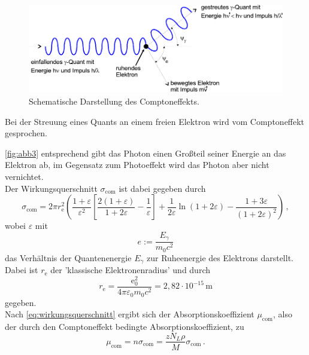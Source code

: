 \begin{figure}[H]
    \centering
    \includegraphics{figures/abb3.pdf}
    \caption{Schematische Darstellung des Comptoneffekts\cite{ap04}.}
    \label{fig:abb3}
\end{figure}

Bei der Streuung eines Quants an einem freien Elektron wird vom
Comptoneffekt gesprochen.


\autoref{fig:abb3} entsprechend gibt das Photon einen Großteil
seiner Energie an das Elektron ab, im Gegensatz zum Photoeffekt
wird das Photon aber nicht vernichtet. \\

Der Wirkungsquerschnitt $\sigma_{\mathrm{com}}$ ist dabei gegeben durch
\begin{equation}
    \sigma_{\mathrm{com}} = 2 \pi r^2_\mathrm{e} 
    \left(\frac{1 + \varepsilon}{\varepsilon^2} 
    \left[\frac{2(1 + \varepsilon)}{1 + 2 \varepsilon} -\frac{1}{\varepsilon}\right]
    + \frac{1}{2 \varepsilon} \ln(1 + 2 \varepsilon) 
    - \frac{1 + 3 \varepsilon}{(1 + 2 \varepsilon)^2}\right) \,,
    \label{eq:wirkungsquercompton}
\end{equation}
wobei $\varepsilon$ mit
\begin{equation*}
    e := \frac{E_\gamma}{m_0 c^2}
\end{equation*}
das Verhältnis der Quantenenergie $E_\gamma$ zur Ruheenergie 
des Elektrons darstellt.
Dabei ist $r_\text{e}$ der 'klassische Elektronenradius' und durch
\begin{equation*}
    r_\text{e} = \frac{\text{e}_0^2}
    {4 \pi \varepsilon_0 m_0 c^2} = 2,82 \cdot 10^{-15} \,\unit{\meter}
\end{equation*}
gegeben. \\

Nach \eqref{eq:wirkungsquerschnitt} ergibt sich der Absorptionskoeffizient
$\mu_{\text{com}}$, also der durch den Comptoneffekt bedingte
Absorptionskoeffizient, zu
\begin{equation*}
    \mu_{\text{com}} = n \sigma_{\text{com}} =  
    \frac{z N_L \rho}{M} \sigma_{\text{com}} \,.
\end{equation*} 

